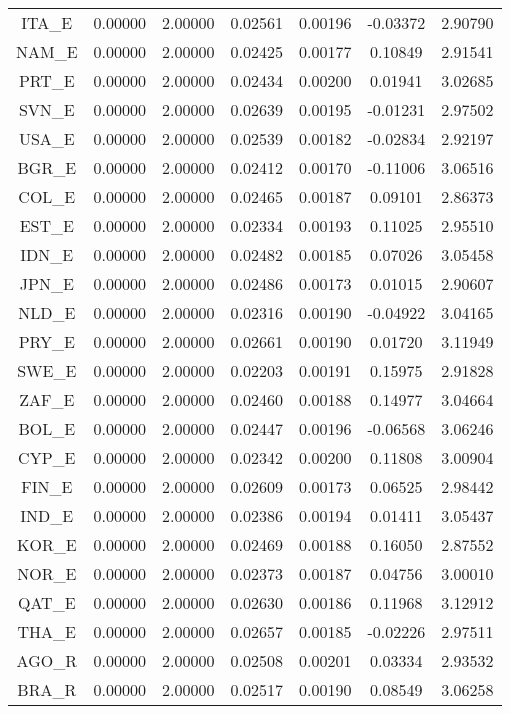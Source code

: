 \begin{longtable}{c c c c c c c}
ITA_E & 0.00000 & 2.00000 & 0.02561 & 0.00196 & -0.03372 & 2.90790 \\
NAM_E & 0.00000 & 2.00000 & 0.02425 & 0.00177 & 0.10849 & 2.91541 \\
PRT_E & 0.00000 & 2.00000 & 0.02434 & 0.00200 & 0.01941 & 3.02685 \\
SVN_E & 0.00000 & 2.00000 & 0.02639 & 0.00195 & -0.01231 & 2.97502 \\
USA_E & 0.00000 & 2.00000 & 0.02539 & 0.00182 & -0.02834 & 2.92197 \\
BGR_E & 0.00000 & 2.00000 & 0.02412 & 0.00170 & -0.11006 & 3.06516 \\
COL_E & 0.00000 & 2.00000 & 0.02465 & 0.00187 & 0.09101 & 2.86373 \\
EST_E & 0.00000 & 2.00000 & 0.02334 & 0.00193 & 0.11025 & 2.95510 \\
IDN_E & 0.00000 & 2.00000 & 0.02482 & 0.00185 & 0.07026 & 3.05458 \\
JPN_E & 0.00000 & 2.00000 & 0.02486 & 0.00173 & 0.01015 & 2.90607 \\
NLD_E & 0.00000 & 2.00000 & 0.02316 & 0.00190 & -0.04922 & 3.04165 \\
PRY_E & 0.00000 & 2.00000 & 0.02661 & 0.00190 & 0.01720 & 3.11949 \\
SWE_E & 0.00000 & 2.00000 & 0.02203 & 0.00191 & 0.15975 & 2.91828 \\
ZAF_E & 0.00000 & 2.00000 & 0.02460 & 0.00188 & 0.14977 & 3.04664 \\
BOL_E & 0.00000 & 2.00000 & 0.02447 & 0.00196 & -0.06568 & 3.06246 \\
CYP_E & 0.00000 & 2.00000 & 0.02342 & 0.00200 & 0.11808 & 3.00904 \\
FIN_E & 0.00000 & 2.00000 & 0.02609 & 0.00173 & 0.06525 & 2.98442 \\
IND_E & 0.00000 & 2.00000 & 0.02386 & 0.00194 & 0.01411 & 3.05437 \\
KOR_E & 0.00000 & 2.00000 & 0.02469 & 0.00188 & 0.16050 & 2.87552 \\
NOR_E & 0.00000 & 2.00000 & 0.02373 & 0.00187 & 0.04756 & 3.00010 \\
QAT_E & 0.00000 & 2.00000 & 0.02630 & 0.00186 & 0.11968 & 3.12912 \\
THA_E & 0.00000 & 2.00000 & 0.02657 & 0.00185 & -0.02226 & 2.97511 \\
AGO_R & 0.00000 & 2.00000 & 0.02508 & 0.00201 & 0.03334 & 2.93532 \\
BRA_R & 0.00000 & 2.00000 & 0.02517 & 0.00190 & 0.08549 & 3.06258 \\

\end{longtable}
